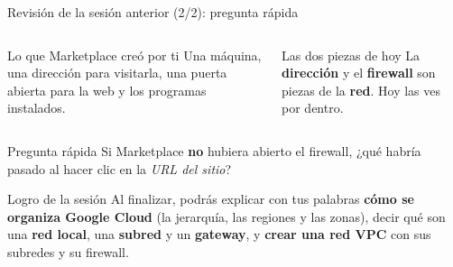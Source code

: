 \documentclass[aspectratio=169,10pt,c]{beamer}
\begin{document}
\begin{frame}{Revisión de la sesión anterior (2/2): pregunta rápida}
\begin{center}
\end{center}
\begin{columns}[T,onlytextwidth]
\begin{block}{Lo que Marketplace creó por ti}
\small Una máquina, una dirección para visitarla, una puerta abierta para la web y los programas instalados.
\end{block}
\begin{exampleblock}{Las dos piezas de hoy}
\small La \textbf{dirección} y el \textbf{firewall} son piezas de la \textbf{red}. Hoy las ves por dentro.
\end{exampleblock}
\end{columns}
\par\vspace{1mm}
\begin{alertblock}{Pregunta rápida}
\small Si Marketplace \textbf{no} hubiera abierto el firewall, ¿qué habría pasado al hacer clic en la \emph{URL del sitio}?
\end{alertblock}
\end{frame}

\begin{frame}[c]
\begin{block}{Logro de la sesión}
Al finalizar, podrás explicar con tus palabras \textbf{cómo se organiza Google Cloud} (la jerarquía, las regiones y las zonas), decir qué son una \textbf{red local}, una \textbf{subred} y un \textbf{gateway}, y \textbf{crear una red VPC} con sus subredes y su firewall.
\end{block}
\end{frame}
\end{document}
